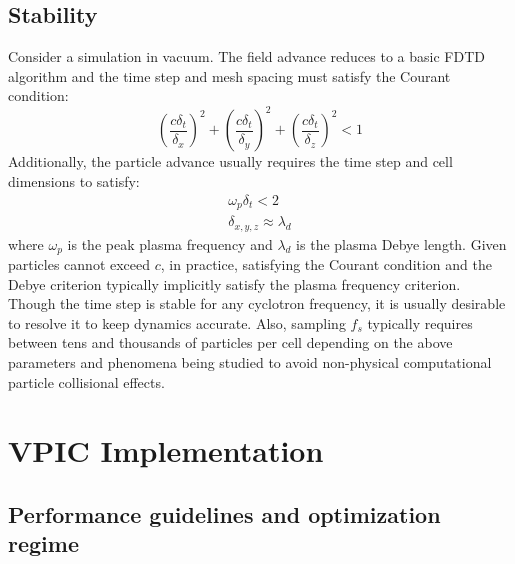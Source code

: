 \documentclass[aps,prl,preprint,preprintnumbers,groupedaddress]{revtex4}
\begin{document}
\subsection{Stability}

Consider a simulation in vacuum.  The field advance reduces to a basic
FDTD algorithm \cite{Yee_1966} and the time step and mesh spacing must
satisfy the Courant condition:
\begin{equation}
\left(\frac{c\delta_t}{\delta_x}\right)^2 +
\left(\frac{c\delta_t}{\delta_y}\right)^2 +
\left(\frac{c\delta_t}{\delta_z}\right)^2 < 1
\end{equation}
Additionally, the particle advance usually requires the time step and
cell dimensions to satisfy:
\begin{eqnarray}
\omega_p \delta_t < 2 \\
\delta_{x,y,z} \approx \lambda_d
\end{eqnarray}
where $\omega_p$ is the peak plasma frequency and $\lambda_d$ is the
plasma Debye length.  Given particles cannot exceed $c$, in practice,
satisfying the Courant condition and the Debye criterion typically
implicitly satisfy the plasma frequency criterion.  Though the time
step is stable for any cyclotron frequency, it is usually desirable to
resolve it to keep dynamics accurate.  Also, sampling $f_s$ typically
requires between tens and thousands of particles per cell depending on
the above parameters and phenomena being studied to avoid non-physical
computational particle collisional effects.

\section{VPIC Implementation}

\subsection{Performance guidelines and optimization regime}
\end{document}
